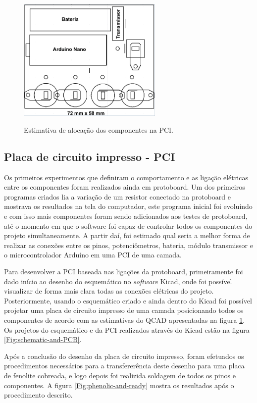 \documentclass[
	12pt,				%
	openright,			%
	oneside,			%
	a4paper,			%
	english,			%
	brazil				%
	]{abntex2}
\begin{document}
		\begin{figure}[h!]
			\centering
			\caption{Estimativa de alocação dos componentes na PCI.}
  		\includegraphics[width=7cm]{figures/size-glove-module1.png}
  		\label{Fig:size-glove-module1}
		\end{figure}


			\subsection{Placa de circuito impresso - PCI}

			Os primeiros experimentos que definiram o comportamento e as ligação elétricas entre os componentes foram realizados ainda em protoboard. Um dos primeiros programas criados lia a variação de um resistor conectado na protoboard e mostrava os resultados na tela do computador, este programa inicial foi evoluindo e com isso mais componentes foram sendo adicionados aos testes de protoboard, até o momento em que o software foi capaz de controlar todos os componentes do projeto simultaneamente. A partir daí, foi estimado  qual seria a melhor forma de realizar as conexões entre os pinos, potenciômetros, bateria, módulo transmissor e o microcontrolador Arduíno em uma PCI de uma camada.

			Para desenvolver a PCI baseada nas ligações da protoboard, primeiramente foi dado início ao desenho do esquemático no \textit{software} Kicad, onde foi possível visualizar de forma mais clara todas as conexões elétricas do projeto. Posteriormente, usando o esquemático criado e ainda dentro do Kicad foi possível projetar uma placa de circuito impresso de uma camada posicionando todos os componentes de acordo com as estimativas do QCAD apresentadas na figura \ref{Fig:size-glove-module1}. Os projetos do esquemático e da PCI realizados através do Kicad estão na figura \ref{Fig:schematic-and-PCB}.

			Após a conclusão do desenho da placa de circuito impresso, foram efetuados os procedimentos necessários para a transfererência deste desenho para uma placa de fenolite cobreada, e logo depois foi realizida soldagem de todos os pinos e componentes. A figura \ref{Fig:phenolic-and-ready} mostra os resultados após o procedimento descrito. 
		
\end{document}
